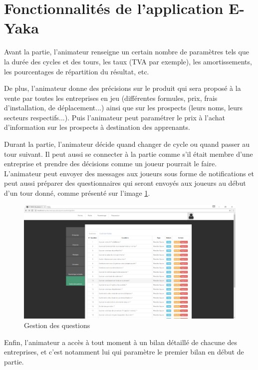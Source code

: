    \section{Fonctionnalités de l'application E-Yaka}
    
        Avant la partie, l'animateur renseigne un certain nombre de paramètres tels que la durée des cycles et des tours, les taux (TVA par exemple), les amortissements, les pourcentages de répartition du résultat, etc.

        De plus, l'animateur donne des précisions sur le produit qui sera proposé à la vente par toutes les entreprises en jeu (différentes formules, prix, frais d'installation, de déplacement...) ainsi que sur les prospects (leurs noms, leurs secteurs respectifs...). Puis l'animateur peut paramétrer le prix à l'achat d'information sur les prospects à destination des apprenants.

        Durant la partie, l'animateur décide quand changer de cycle ou quand passer au tour suivant. Il peut aussi se connecter à la partie comme s'il était membre d'une entreprise et prendre des décisions comme un joueur pourrait le faire.
        L'animateur peut envoyer des messages aux joueurs sous forme de notifications et peut aussi préparer des questionnaires qui seront envoyés aux joueurs au début d'un tour donné, comme présenté sur l'image \ref{questionnaire}.

        \begin{figure}
        	\centering
            \includegraphics[scale=0.88]{images/questionnaire.png}
            \caption{Gestion des questions}
            \label{questionnaire}
        \end{figure}


        Enfin, l'animateur a accès à tout moment à un bilan détaillé de chacune des entreprises, et c'est notamment lui qui paramètre le premier bilan en début de partie.

